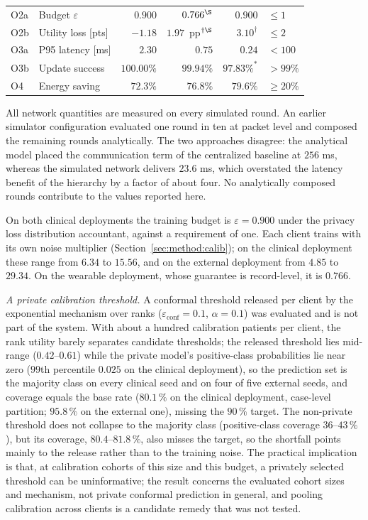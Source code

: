 \begin{table}[!t]
\begin{tabular}{llrrrl}
O2a & Budget $\varepsilon$ & $0.900$    & $0.766^{\S}$ & $0.900$    & $\le 1$ \\
O2b & Utility loss [pts] & $-1.18$ & $1.97$~pp$^{\dagger\S}$ & $3.10^{\dagger}$ & $\le 2$ \\
O3a & P95 latency [ms]   & $2.30$  & $0.75$  & $0.24$  & $< 100$ \\
O3b & Update success     & $100.00\%$ & $99.94\%$  & $97.83\%^{\ast}$ & $> 99\%$ \\
O4  & Energy saving      & $72.3\%$   & $76.8\%$   & $79.6\%$   & $\ge 20\%$ \\
\bottomrule
\end{tabular}
\end{table}



All network quantities are measured on every simulated round. An earlier
simulator configuration evaluated one round in ten at packet level and composed
the remaining rounds analytically. The two approaches disagree: the analytical
model placed the communication term of the centralized baseline at $256$ ms,
whereas the simulated network delivers $23.6$ ms, which overstated the latency
benefit of the hierarchy by a factor of about four. No analytically composed
rounds contribute to the values reported here.

On both clinical deployments the training budget is $\varepsilon = 0.900$
under the privacy loss distribution accountant, against a requirement of one.
Each client trains with its own noise multiplier
(Section~\ref{sec:method:calib}); on the clinical deployment these range from
$6.34$ to $15.56$, and on the external deployment from $4.85$ to $29.34$. On
the wearable deployment, whose guarantee is record-level, it is $0.766$.

\emph{A private calibration threshold.} A conformal threshold released per
client by the exponential mechanism over ranks \cite{ref30, ref24}
($\varepsilon_{\mathrm{conf}} = 0.1$, $\alpha = 0.1$) was evaluated and is not
part of the system. With about a hundred calibration patients per client, the
rank utility barely separates candidate thresholds; the released threshold
lies mid-range ($0.42$--$0.61$) while the private model's positive-class
probabilities lie near zero ($99$th percentile $0.025$ on the clinical
deployment), so the prediction set is the majority class on every clinical
seed and on four of five external seeds, and coverage equals the base rate
($80.1\,\%$ on the clinical deployment, case-level partition; $95.8\,\%$ on
the external one), missing the $90\,\%$ target. The non-private threshold
does not collapse to the majority class (positive-class coverage
$36$--$43\,\%$), but its coverage, $80.4$--$81.8\,\%$, also misses the
target, so the shortfall points mainly to the release rather than to the
training noise. The practical implication is that, at calibration cohorts of
this size and this budget, a privately selected threshold can be
uninformative; the result concerns the evaluated cohort sizes and mechanism,
not private conformal prediction in general, and pooling calibration across
clients is a candidate remedy that was not tested.

